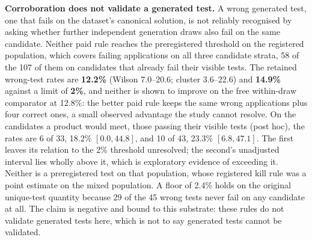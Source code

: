 \textbf{Corroboration does not validate a generated test.} A wrong generated test, one that fails
on the dataset's canonical solution, is not reliably recognised by asking whether further
independent generation draws also fail on the same candidate. Neither paid rule reaches the
preregistered threshold on the registered population, which covers failing applications on all
three candidate strata, 58 of the 107 of them on candidates that already fail their visible
tests. The retained wrong-test rates are \textbf{12.2\%} (Wilson 7.0--20.6; cluster 3.6--22.6) and
\textbf{14.9\%} against a limit of \textbf{2\%}, and neither is shown to improve on the free
within-draw comparator at 12.8\%: the better paid rule keeps the same wrong applications plus four
correct ones, a small observed advantage the study cannot resolve. On the candidates a product
would meet, those passing their visible tests (post hoc), the rates are 6 of 33, 18.2\%
$[0.0, 44.8]$, and 10 of 43, 23.3\% $[6.8, 47.1]$. The first leaves its relation to the 2\%
threshold unresolved; the second's unadjusted interval lies wholly above it, which is exploratory
evidence of exceeding it. Neither is a preregistered test on that population, whose registered
kill rule was a point estimate on the mixed population. A floor of 2.4\% holds on the original
unique-test quantity because 29 of the 45 wrong tests never fail on any candidate at all. The
claim is negative and bound to this substrate: these rules do not validate generated tests here,
which is not to say generated tests cannot be validated.

